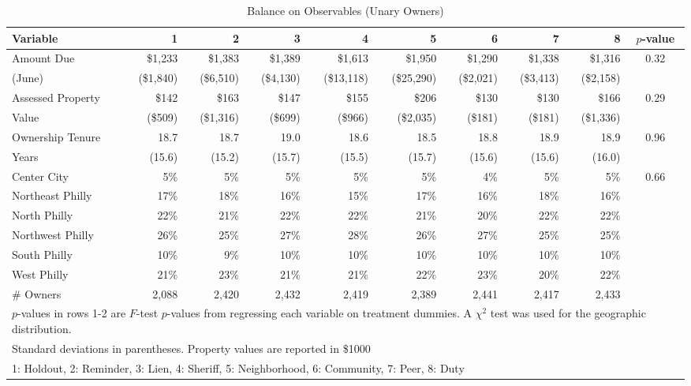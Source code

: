 \documentclass[12pt]{article}
\begin{document}
\begin{sidewaystable}[htbp]
\centering
\caption{Balance on Observables (Unary Owners)}
\label{balance}
\vspace{10mm}
\begin{tabular}{lrrrrrrrrc}
  \hline
Variable & 1 & 2 & 3 & 4 & 5 & 6 & 7 & 8 & $p$-value \\
   \hline
Amount Due & \$1,233 & \$1,383 & \$1,389 & \$1,613 & \$1,950 & \$1,290 & \$1,338 & \$1,316 & 0.32 \\
  (June) & (\$1,840) & (\$6,510) & (\$4,130) & (\$13,118) & (\$25,290) & (\$2,021) & (\$3,413) & (\$2,158) &  \\
  Assessed Property & \$142 & \$163 & \$147 & \$155 & \$206 & \$130 & \$130 & \$166 & 0.29 \\
  Value & (\$509) & (\$1,316) & (\$699) & (\$966) & (\$2,035) & (\$181) & (\$181) & (\$1,336) &  \\
  Ownership Tenure & 18.7 & 18.7 & 19.0 & 18.6 & 18.5 & 18.8 & 18.9 & 18.9 & 0.96 \\
  Years & (15.6) & (15.2) & (15.7) & (15.5) & (15.7) & (15.6) & (15.6) & (16.0) &  \\
  Center City & 5\% & 5\% & 5\% & 5\% & 5\% & 4\% & 5\% & 5\% & 0.66 \\
  Northeast Philly & 17\% & 18\% & 16\% & 15\% & 17\% & 16\% & 18\% & 16\% &  \\
  North Philly & 22\% & 21\% & 22\% & 22\% & 21\% & 20\% & 22\% & 22\% &  \\
  Northwest Philly & 26\% & 25\% & 27\% & 28\% & 26\% & 27\% & 25\% & 25\% &  \\
  South Philly & 10\% &  9\% & 10\% & 10\% & 10\% & 10\% & 10\% & 10\% &  \\
  West Philly & 21\% & 23\% & 21\% & 21\% & 22\% & 23\% & 20\% & 22\% &  \\
  \# Owners & 2,088 & 2,420 & 2,432 & 2,419 & 2,389 & 2,441 & 2,417 & 2,433 &  \\
  \hline
\multicolumn{10}{l}{\scriptsize{$p$-values in rows 1-2 are $F$-test
    $p$-values from regressing each variable on treatment dummies. A
    $\chi^2$ test was used for the geographic distribution. }} \\
\multicolumn{10}{l}{\scriptsize{ Standard deviations in parentheses. Property values are reported in \$1000 }} \\
\multicolumn{10}{l}{\scriptsize{1: Holdout, 2: Reminder, 3: Lien, 4: Sheriff, 5: Neighborhood, 6: Community, 7: Peer, 8: Duty}} \\
\end{tabular}
\end{sidewaystable}
\end{document}
